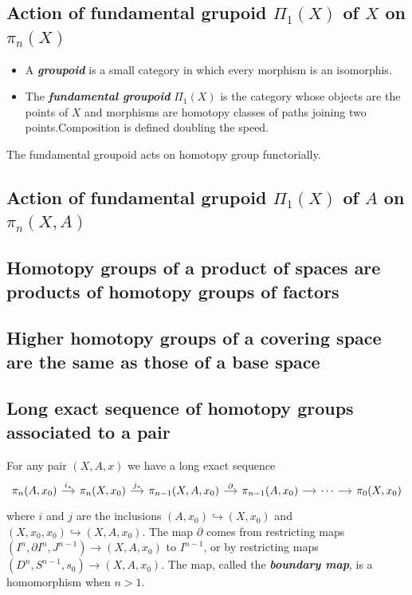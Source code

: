 \subsection{Action of fundamental grupoid \texorpdfstring{$\Pi_1(X)$}{Π₁(X)} of \texorpdfstring{$X$}{X} on \texorpdfstring{$\pi_{n}(X)$}{π₁(X)}}
\begin{itemize}
	\item A \textit{\textbf{groupoid}} is a small category in which every morphism is an isomorphis.
	\item The \textit{\textbf{fundamental groupoid}} $\Pi_{1}(X)$ is the category whose objects are the points of  $X$ and morphisms are homotopy classes of paths joining two points.Composition is defined doubling the speed.
\end{itemize}

The fundamental groupoid acts on homotopy group functorially.

\subsection{Action of fundamental grupoid \texorpdfstring{$\Pi_1(X)$}{Π₁(X)} of \texorpdfstring{$A$}{A} on \texorpdfstring{$\pi_{n}(X,A)$}{π₁(X,A)}}

\subsection{Homotopy groups of a product of spaces are products of homotopy groups of factors}

\subsection{Higher homotopy groups of a covering space are the same as those of a base space}

\subsection{Long exact sequence of homotopy groups associated to a pair}

For any pair $(X,A,x)$ we have a long exact sequence
\[\begin{tikzcd}[column sep=small]
	\pi_n(A,x_0)\arrow[r,"i_*"]&\pi_{n}(X,x_0)\arrow[r,"j_*"]&\pi_{n-1}(X,A,x_0)\arrow[r,"\partial"]&\pi_{n-1}(A,x_0)\arrow[r]&\cdots\arrow[r]&\pi_0(X,x_0)
\end{tikzcd}\]
where $i$ and $j$ are the inclusions $(A,x_0)\hookrightarrow(X,x_0)$ and $(X,x_0,x_0)\hookrightarrow(X,A,x_0)$. The map $\partial$ comes from restricting maps $(I^n,\partial I^n,J^{n-1})\to (X,A,x_0)$ to $I^{n-1}$, or by restricting maps $(D^n,S^{n-1},s_0)\to (X,A,x_0)$. The map, called the \textbf{\textit{boundary map}}, is a homomorphism when $n>1$.

